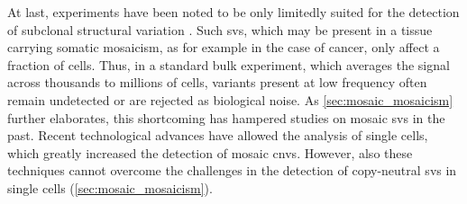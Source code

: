 At last, \mps experiments have been noted to be only limitedly suited for the
detection of subclonal structural variation \citep{Forsberg2017}. Such \acp{sv},
which may be present in a tissue carrying somatic mosaicism, as for example in the case of cancer,
only affect a fraction of cells. Thus, in a standard bulk \mps experiment, which
averages the signal across thousands to millions of cells, variants present at
low frequency often remain undetected or are rejected as biological noise. As \cref{sec:mosaic_mosaicism} further
elaborates, this shortcoming has hampered studies on mosaic \acp{sv} in the past.
Recent technological advances have allowed the analysis of single cells, which greatly
increased the detection of mosaic \acp{cnv}. However, also
these techniques cannot overcome the challenges in the detection of copy-neutral
\acp{sv} in single cells (\cref{sec:mosaic_mosaicism}).
